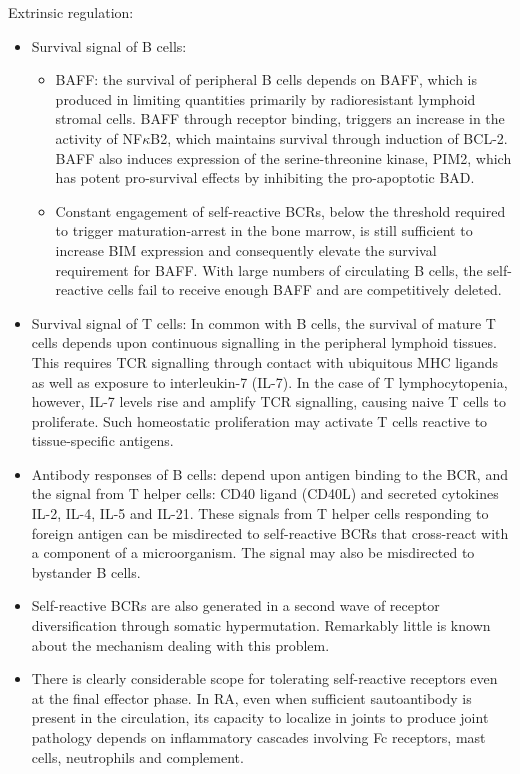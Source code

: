 \documentclass{report}
\begin{document}
Extrinsic regulation: 
\begin{itemize}
\item Survival signal of B cells: 
\begin{itemize}
	\item BAFF: the survival of peripheral B cells depends on BAFF, which is produced in limiting quantities primarily by radioresistant lymphoid stromal cells. BAFF through receptor binding, triggers an increase in the activity of NF$\kappa$B2, which maintains survival through induction of BCL-2. BAFF also induces expression of the serine-threonine kinase, PIM2, which has potent pro-survival effects by inhibiting the pro-apoptotic BAD. 
	\item Constant engagement of self-reactive BCRs, below the threshold required to trigger maturation-arrest in the bone marrow, is still sufficient to increase BIM expression and consequently elevate the survival requirement for BAFF. With large numbers of circulating B cells, the self-reactive cells fail to receive enough BAFF and are competitively deleted.
\end{itemize}
	
\item Survival signal of T cells: In common with B cells, the survival of mature T cells depends upon continuous signalling in the peripheral lymphoid tissues. This requires TCR signalling through contact with ubiquitous MHC ligands as well as exposure to interleukin-7 (IL-7). In the case of T lymphocytopenia, however, IL-7 levels rise and amplify TCR signalling, causing naive T cells to proliferate. Such homeostatic proliferation may activate T cells reactive to tissue-specific antigens. 

\item Antibody responses of B cells: depend upon antigen binding to the BCR, and the signal from T helper cells: CD40 ligand (CD40L) and secreted cytokines IL-2, IL-4, IL-5 and IL-21. These signals from T helper cells responding to foreign antigen can be misdirected to self-reactive BCRs that cross-react with a component of a microorganism. The signal may also be misdirected to bystander B cells.

\item Self-reactive BCRs are also generated in a second wave of receptor diversification through somatic hypermutation. Remarkably little is known about the mechanism dealing with this problem. 

\item There is clearly considerable scope for tolerating self-reactive receptors even at the final effector phase. In RA, even when sufficient sautoantibody is present in the circulation, its capacity to localize in joints to produce joint pathology depends on inflammatory cascades involving Fc receptors, mast cells, neutrophils and complement. 
\end{itemize}
\end{document}
